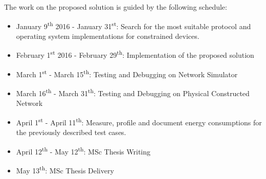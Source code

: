 The work on the proposed solution is guided by the following schedule:

\begin{itemize}
	\item January 9\textsuperscript{th} 2016 - January 31\textsuperscript{st}: Search for the most suitable protocol and operating system implementations for constrained devices.
	\item February 1\textsuperscript{st} 2016 - February 29\textsuperscript{th}: Implementation of the proposed solution
	\item March 1\textsuperscript{st} - March 15\textsuperscript{th}: Testing and Debugging on Network Simulator
	\item March 16\textsuperscript{th} - March 31\textsuperscript{th}: Testing and Debugging on Physical Constructed Network
	\item April 1\textsuperscript{st} - April 11\textsuperscript{th}: Measure, profile and document energy consumptions for the previously described test cases.
	\item April 12\textsuperscript{th} - May 12\textsuperscript{th}: MSc Thesis Writing
	\item May 13\textsuperscript{th}: MSc Thesis Delivery
\end{itemize}